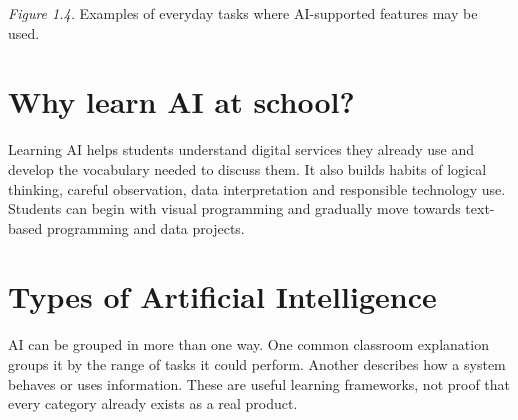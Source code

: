 \documentclass[11pt,openany,oneside]{book}
\begin{document}
\begin{center}
\end{center}
\textit{Figure 1.4.} Examples of everyday tasks where AI-supported features may be used.

\section{Why learn AI at school?}
Learning AI helps students understand digital services they already use and develop the vocabulary needed to discuss them. It also builds habits of logical thinking, careful observation, data interpretation and responsible technology use. Students can begin with visual programming and gradually move towards text-based programming and data projects.

\section{Types of Artificial Intelligence}
AI can be grouped in more than one way. One common classroom explanation groups it by the range of tasks it could perform. Another describes how a system behaves or uses information. These are useful learning frameworks, not proof that every category already exists as a real product.
\end{document}
